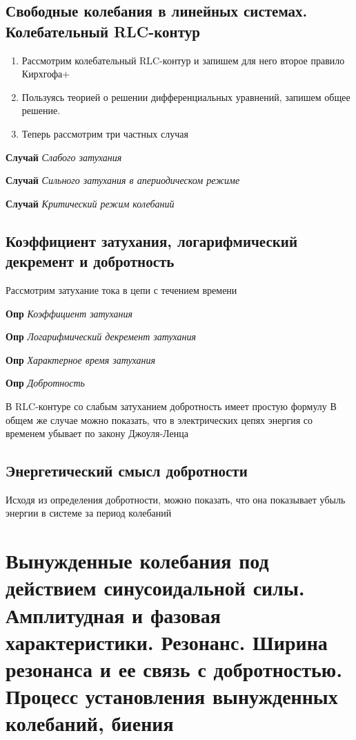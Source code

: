 \documentclass[a4paper, 14pt]{article}
\begin{document}
    \subsection{Свободные колебания в линейных системах. Колебательный RLC-контур}
    
    \begin{enumerate}
        \item Рассмотрим колебательный RLC-контур и запишем для него второе правило Кирхгофа+
        \item Пользуясь теорией о решении дифференциальных уравнений, запишем общее решение.
        \item Теперь рассмотрим три частных случая
    \end{enumerate}
    
    \textbf{Случай} \textit{Слабого затухания}
    
    \textbf{Случай} \textit{Сильного затухания в апериодическом режиме}
    
    \textbf{Случай} \textit{Критический режим колебаний}
    
    \subsection{Коэффициент затухания, логарифмический декремент и добротность}
    
    Рассмотрим затухание тока в цепи с течением времени
    
    \textbf{Опр} \textit{Коэффициент затухания}
    
    \textbf{Опр} \textit{Логарифмический декремент затухания}
    
    \textbf{Опр} \textit{Характерное время затухания}
    
    \textbf{Опр} \textit{Добротность}
    
    В RLC-контуре со слабым затуханием добротность имеет простую формулу
    В общем же случае можно показать, что в электрических цепях энергия со временем убывает по закону Джоуля-Ленца
    
    \subsection{Энергетический смысл добротности}
    
    Исходя из определения добротности, можно показать, что она показывает убыль энергии в системе за период колебаний
    
    \section{Вынужденные колебания под действием синусоидальной силы.
    Амплитудная и фазовая характеристики.
    Резонанс.
    Ширина резонанса и ее связь с добротностью.
    Процесс установления вынужденных колебаний, биения}
    
\end{document}
